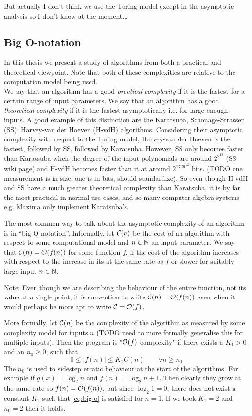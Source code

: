 But actually I don't think we use the Turing model except in the asymptotic analysis so I don't know at the moment...

\subsection{Big O-notation}%
\label{sub:Big O-notation}

In this thesis we present a study of algorithms from both a practical and theoretical viewpoint. Note that both of these complexities are relative to the computation model being used.\\
We say that an algorithm has a good \textit{practical complexity} if it is the fastest for a certain range of input parameters. We say that an algorithm has a good \textit{theoretical complexity} if it is the fastest asymptotically i.e. for large enough inputs. A good example of this distinction are the Karatsuba, Schonage-Strassen (SS), Harvey-van der Hoeven (H-vdH) algorithms. Considering their asymptotic complexity with respect to the Turing model, Harvey-van der Hoeven is the fastest, followed by SS, followed by Karatsuba. However, SS only becomes faster than Karatsuba when the degree of the input polynomials are around $2^{2^{15}}$ (SS wiki page) and H-vdH becomes faster than it at around $2^{1729^{12}}$ bits. (TODO one measurement is in size, one is in bits, should standardize). So even though H-vdH and SS have a much greater theoretical complexity than Karatsuba, it is by far the most practical in normal use cases, and so many computer algebra systems e.g. Maxima only implement Karatsuba's.

The most common way to talk about the asymptotic complexity of an algorithm is in ``big-O notation''. Informally, let $\mathcal C(n)$ be the cost of an algorithm with respect to some computational model and $n \in {\mathbb N}$ an input parameter. We say that $\mathcal C(n) = \mathcal O(f(n))$ for some function $f$, if the cost of the algorithm increases with respect to the increase in its at the same rate as $f$ or slower for suitably large input $n \in {\mathbb N}$.

Note: Even though we are describing the behaviour of the entire function, not its value at a single point, it is convention to write $\mathcal C(n) = \mathcal O(f(n))$ even when it would perhaps be more apt to write $\mathcal C = \mathcal O(f)$.

More formally, let $\mathcal C(n)$ be the complexity of the algorithm as measured by some complexity model for inputs $n$ (TODO need to more formally generalise this for multiple inputs). Then the program is "$\mathcal O(f)$ complexity" if there exists a $K_1 > 0$  and an $n_0 \geq 0$, such that 
\begin{equation}\label{eq:big-o}
    0 \leq |f(n)| \leq K_1C(n) \qquad \forall n \geq n_0
\end{equation}
The $n_0$ is used to sidestep erratic behaviour at the start of the algorithms. For example if $g(x) = \log_2 n$ and $f(n) = \log_2 n + 1$. Then clearly they grow at the same rate so $f(n) = \mathcal O(f(n))$, but since $\log_2 1 = 0$, there does not exist a constant $K_1$ such that \eqref{eq:big-o} is satisfied for $n = 1$. If we took $K_1 = 2$ and $n_0 = 2$ then it holds.

